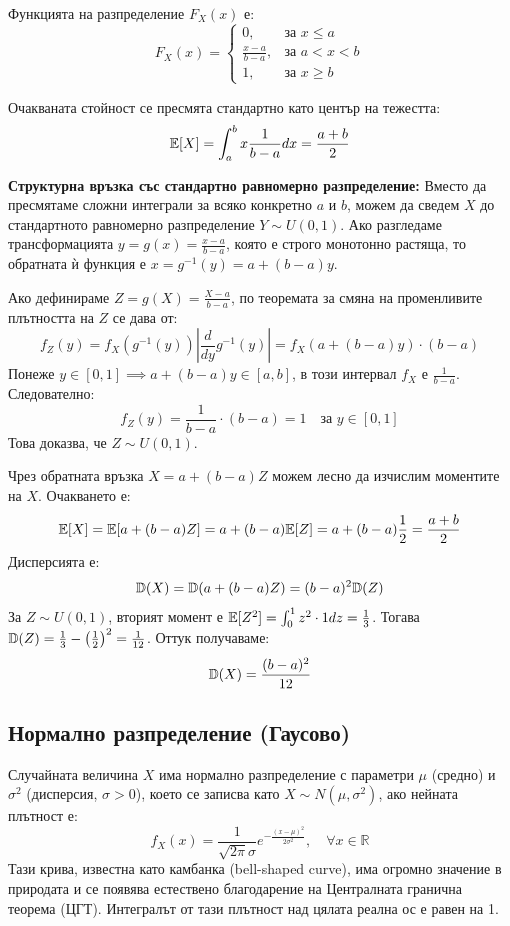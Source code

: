 Функцията на разпределение $F_X(x)$ е:
\[
F_X(x) =
\begin{cases}
0, & \text{за } x \le a \\
\frac{x-a}{b-a}, & \text{за } a < x < b \\
1, & \text{за } x \ge b
\end{cases}
\]

Очакваната стойност се пресмята стандартно като център на тежестта:
\[
\mathbb{E}[X] = \int_{a}^{b} x \frac{1}{b-a} dx = \frac{a+b}{2}
\]

\textbf{Структурна връзка със стандартно равномерно разпределение:}
Вместо да пресмятаме сложни интеграли за всяко конкретно $a$ и $b$, можем да сведем $X$ до стандартното равномерно разпределение $Y \sim U(0, 1)$. Ако разгледаме трансформацията $y = g(x) = \frac{x-a}{b-a}$, която е строго монотонно растяща, то обратната ѝ функция е $x = g^{-1}(y) = a + (b-a)y$.

Ако дефинираме $Z = g(X) = \frac{X-a}{b-a}$, по теоремата за смяна на променливите плътността на $Z$ се дава от:
\[
f_Z(y) = f_X(g^{-1}(y)) \left| \frac{d}{dy} g^{-1}(y) \right| = f_X(a + (b-a)y) \cdot (b-a)
\]
Понеже $y \in [0, 1] \implies a + (b-a)y \in [a, b]$, в този интервал $f_X$ е $\frac{1}{b-a}$. Следователно:
\[
f_Z(y) = \frac{1}{b-a} \cdot (b-a) = 1 \quad \text{за } y \in [0, 1]
\]
Това доказва, че $Z \sim U(0, 1)$.

Чрез обратната връзка $X = a + (b-a)Z$ можем лесно да изчислим моментите на $X$. Очакването е:
\[
\mathbb{E}[X] = \mathbb{E}[a + (b-a)Z] = a + (b-a)\mathbb{E}[Z] = a + (b-a)\frac{1}{2} = \frac{a+b}{2}
\]
Дисперсията е:
\[
\mathbb{D}(X) = \mathbb{D}(a + (b-a)Z) = (b-a)^2 \mathbb{D}(Z)
\]
За $Z \sim U(0,1)$, вторият момент е $\mathbb{E}[Z^2] = \int_0^1 z^2 \cdot 1 dz = \frac{1}{3}$. Тогава $\mathbb{D}(Z) = \frac{1}{3} - \left(\frac{1}{2}\right)^2 = \frac{1}{12}$. Оттук получаваме:
\[
\mathbb{D}(X) = \frac{(b-a)^2}{12}
\]

\subsection{Нормално разпределение (Гаусово)}

Случайната величина $X$ има нормално разпределение с параметри $\mu$ (средно) и $\sigma^2$ (дисперсия, $\sigma > 0$), което се записва като $X \sim N(\mu, \sigma^2)$, ако нейната плътност е:
\[
f_X(x) = \frac{1}{\sqrt{2\pi}\sigma} e^{-\frac{(x-\mu)^2}{2\sigma^2}}, \quad \forall x \in \mathbb{R}
\]
Тази крива, известна като камбанка (bell-shaped curve), има огромно значение в природата и се появява естествено благодарение на Централната гранична теорема (ЦГТ). Интегралът от тази плътност над цялата реална ос е равен на 1.

